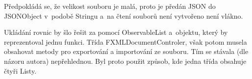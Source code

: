 \documentclass[a4paper,oneside,12p]{report}
\let\openright=\clearpage
\begin{document}
Předpokládá se, že velikost souboru je malá, proto je předán JSON do JSONObject v~podobě Stringu a~na čtení souborů není vytvořeno není vlákno.

Ukládání rovnic by šlo řešit za pomocí ObservableList a~objektu, který by reprezentoval jednu funkci.
Třída FXMLDocumentControler, však potom musela obsahovat metody pro exportování a importování ze souboru.
Tím se stávala (dle názoru autora) nepřehlednou.
Byl proto použit způsob, kde jedna třída obsahuje čtyři Listy.





\openright
\end{document}
